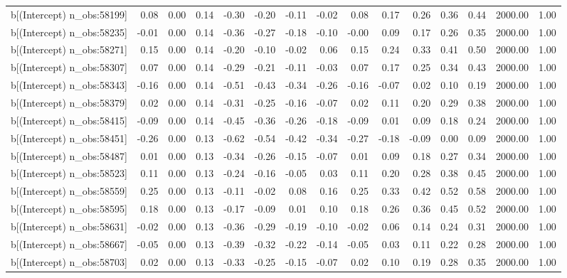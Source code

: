 \begin{table}[ht]
\begin{tabular}{rrrrrrrrrrrrrrr}
  b[(Intercept) n\_obs:58199] & 0.08 & 0.00 & 0.14 & -0.30 & -0.20 & -0.11 & -0.02 & 0.08 & 0.17 & 0.26 & 0.36 & 0.44 & 2000.00 & 1.00 \\ 
  b[(Intercept) n\_obs:58235] & -0.01 & 0.00 & 0.14 & -0.36 & -0.27 & -0.18 & -0.10 & -0.00 & 0.09 & 0.17 & 0.26 & 0.35 & 2000.00 & 1.00 \\ 
  b[(Intercept) n\_obs:58271] & 0.15 & 0.00 & 0.14 & -0.20 & -0.10 & -0.02 & 0.06 & 0.15 & 0.24 & 0.33 & 0.41 & 0.50 & 2000.00 & 1.00 \\ 
  b[(Intercept) n\_obs:58307] & 0.07 & 0.00 & 0.14 & -0.29 & -0.21 & -0.11 & -0.03 & 0.07 & 0.17 & 0.25 & 0.34 & 0.43 & 2000.00 & 1.00 \\ 
  b[(Intercept) n\_obs:58343] & -0.16 & 0.00 & 0.14 & -0.51 & -0.43 & -0.34 & -0.26 & -0.16 & -0.07 & 0.02 & 0.10 & 0.19 & 2000.00 & 1.00 \\ 
  b[(Intercept) n\_obs:58379] & 0.02 & 0.00 & 0.14 & -0.31 & -0.25 & -0.16 & -0.07 & 0.02 & 0.11 & 0.20 & 0.29 & 0.38 & 2000.00 & 1.00 \\ 
  b[(Intercept) n\_obs:58415] & -0.09 & 0.00 & 0.14 & -0.45 & -0.36 & -0.26 & -0.18 & -0.09 & 0.01 & 0.09 & 0.18 & 0.24 & 2000.00 & 1.00 \\ 
  b[(Intercept) n\_obs:58451] & -0.26 & 0.00 & 0.13 & -0.62 & -0.54 & -0.42 & -0.34 & -0.27 & -0.18 & -0.09 & 0.00 & 0.09 & 2000.00 & 1.00 \\ 
  b[(Intercept) n\_obs:58487] & 0.01 & 0.00 & 0.13 & -0.34 & -0.26 & -0.15 & -0.07 & 0.01 & 0.09 & 0.18 & 0.27 & 0.34 & 2000.00 & 1.00 \\ 
  b[(Intercept) n\_obs:58523] & 0.11 & 0.00 & 0.13 & -0.24 & -0.16 & -0.05 & 0.03 & 0.11 & 0.20 & 0.28 & 0.38 & 0.45 & 2000.00 & 1.00 \\ 
  b[(Intercept) n\_obs:58559] & 0.25 & 0.00 & 0.13 & -0.11 & -0.02 & 0.08 & 0.16 & 0.25 & 0.33 & 0.42 & 0.52 & 0.58 & 2000.00 & 1.00 \\ 
  b[(Intercept) n\_obs:58595] & 0.18 & 0.00 & 0.13 & -0.17 & -0.09 & 0.01 & 0.10 & 0.18 & 0.26 & 0.36 & 0.45 & 0.52 & 2000.00 & 1.00 \\ 
  b[(Intercept) n\_obs:58631] & -0.02 & 0.00 & 0.13 & -0.36 & -0.29 & -0.19 & -0.10 & -0.02 & 0.06 & 0.14 & 0.24 & 0.31 & 2000.00 & 1.00 \\ 
  b[(Intercept) n\_obs:58667] & -0.05 & 0.00 & 0.13 & -0.39 & -0.32 & -0.22 & -0.14 & -0.05 & 0.03 & 0.11 & 0.22 & 0.28 & 2000.00 & 1.00 \\ 
  b[(Intercept) n\_obs:58703] & 0.02 & 0.00 & 0.13 & -0.33 & -0.25 & -0.15 & -0.07 & 0.02 & 0.10 & 0.19 & 0.28 & 0.35 & 2000.00 & 1.00 \\ 

\end{tabular}
\end{table}
